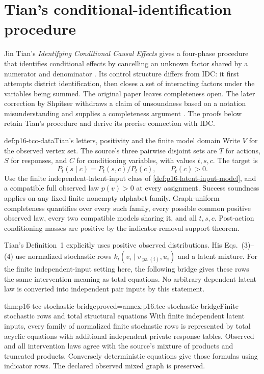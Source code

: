 \section{Tian's conditional-identification procedure}
\label{sec:p16-tian-conditional-identification}

Jin Tian's \emph{Identifying Conditional Causal Effects} gives a
four-phase procedure that identifies conditional effects by cancelling
an unknown factor shared by a numerator and denominator
\cite[Section~4, Eqs.~(25)--(30), Figure~3]{Tian2004ConditionalCausalEffects}.
Its control structure differs from IDC: it first attempts district
identification, then closes a set of interacting factors under the
variables being summed. The original paper leaves completeness open.
The later correction by Shpitser withdraws a claim of unsoundness based
on a notation misunderstanding and supplies a completeness argument
\cite{Shpitser2007ConditionalIdentificationAppendum}. The proofs below
retain Tian's procedure and derive its precise connection with IDC.

\begin{hbdefinition}{def:p16-tcc-data}{Tian's letters, positivity and the finite model domain}
Write \(V\) for the observed vertex set. The source's three
pairwise disjoint sets are \(T\) for actions, \(S\) for responses,
and \(C\) for conditioning variables, with values \(t,s,c\).
The target is
\[
 P_t(s\mid c)=P_t(s,c)/P_t(c),\qquad P_t(c)>0.
\]
Use the finite independent-latent-input class of
\cref{def:p16-latent-input-model},
and a compatible full observed law \(p(v)>0\) at every assignment.
Success soundness applies on any fixed finite nonempty alphabet family.
Graph-uniform completeness quantifies over every such family, every
possible common positive observed law, every two compatible models
sharing it, and all \(t,s,c\). Post-action conditioning masses
are positive by the indicator-removal support theorem.

Tian's Definition~1 explicitly uses positive observed distributions.
His Eqs.~(3)--(4) use normalized stochastic rows
\(k_i(v_i\mid v_{\operatorname{pa}(i)},u_i)\) and a latent
mixture. For the finite independent-input setting here, the following
bridge gives these rows the same intervention meaning as total equations.
No arbitrary dependent latent law is converted into independent
pair inputs by this statement.
\end{hbdefinition}

\begin{hblemma}{thm:p16-tcc-stochastic-bridge}{proved=annex:p16.tcc-stochastic-bridge}{Finite stochastic rows and total structural equations}
With finite independent latent inputs, every family of normalized
finite stochastic rows is represented by total acyclic equations
with additional independent private response tables. Observed and
all intervention laws agree with the source's mixture of products
and truncated products. Conversely deterministic equations give
those formulas using indicator rows. The declared observed mixed
graph is preserved.
\end{hblemma}

